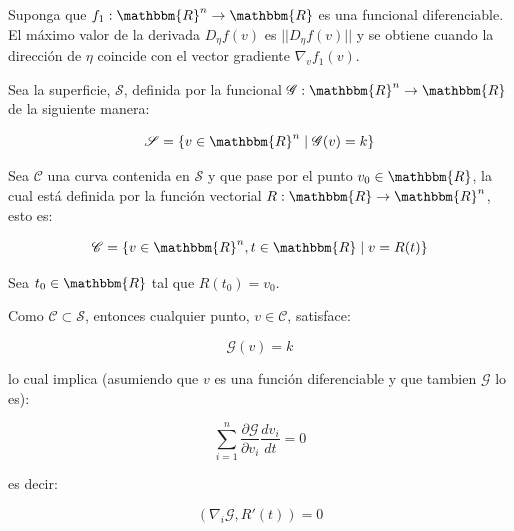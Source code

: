             \begin{teorema}
                Suponga que $f_1: \mathbbm{R}^n \to \mathbbm{R}$ es una funcional diferenciable. El máximo valor de la derivada $D_{\eta}f(v)$ es $||D_{\eta}f(v)||$ y se obtiene cuando la dirección de $\eta$ coincide con el vector gradiente $\nabla_v f_1(v)$.
            \end{teorema}

            Sea la superficie, $\mathscr{S}$, definida por la funcional $\mathscr{G}:\mathbbm{R}^n \to \mathbbm{R}$ de la siguiente manera:

            \begin{equation}
                \mathscr{S} = \left\{ v \in \mathbbm{R}^n \mid \mathscr{G}(v) = k \right\}
            \end{equation}

            Sea $\mathscr{C}$ una curva contenida en $\mathscr{S}$ y que pase por el punto $v_0 \in \mathbbm{R}$, la cual está definida por la función vectorial $R: \mathbbm{R} \to \mathbbm{R}^n$, esto es:

            \begin{equation}
                \mathscr{C} = \left\{ v \in \mathbbm{R}^n, t \in \mathbbm{R} \mid v = R(t)\right\}
            \end{equation}

            Sea $t_0 \in \mathbbm{R}$ tal que $R(t_0) = v_0$.

            Como $\mathscr{C} \subset \mathscr{S}$, entonces cualquier punto, $v \in \mathscr{C}$, satisface:

            \begin{equation*}
                \mathscr{G}(v) = k
            \end{equation*}

            lo cual implica (asumiendo que $v$ es una función diferenciable y que tambien $\mathscr{G}$ lo es):

            \begin{equation*}
                \sum_{i=1}^n \frac{\partial \mathscr{G}}{\partial v_i} \frac{d v_i}{dt} = 0
            \end{equation*}

            es decir:

            \begin{equation*}
                \left( \nabla_i \mathscr{G}, R'(t) \right) = 0
            \end{equation*}

